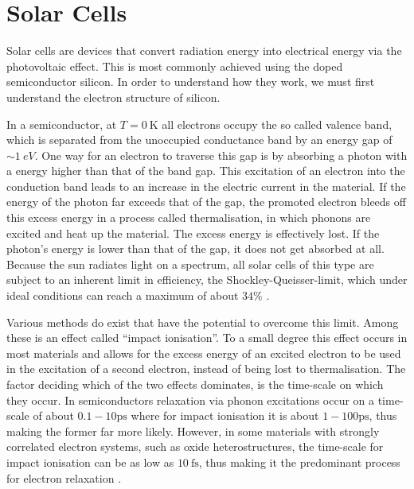 \section{Solar Cells}

Solar cells are devices that convert radiation energy into electrical energy via the photovoltaic effect. This is most commonly achieved using the doped semiconductor silicon. In order to understand how they work, we must first understand the electron structure of silicon.
\medskip

In a semiconductor, at $T=\SI{0}{\kelvin}$ all electrons occupy the so called valence band, which is separated from the unoccupied conductance band by an energy gap of $\sim \SI{1}{eV}$. One way for an electron to traverse this gap is by absorbing a photon with a energy higher than that of the band gap. This excitation of an electron into the conduction band leads to an increase in the electric current in the material. If the energy of the photon far exceeds that of the gap, the promoted electron bleeds off this excess energy in a process called thermalisation, in which phonons are excited and heat up the material. The excess energy is effectively lost. If the photon's energy is lower than that of the gap, it does not get absorbed at all. Because the sun radiates light on a spectrum, all solar cells  of this type are subject to an inherent limit in efficiency, the Shockley-Queisser-limit, which under ideal conditions can reach a maximum of about $34\%$ \cite{shockley_queisser}.

\medskip

Various methods do exist that have the potential to overcome this limit. Among these is an effect called ``impact ionisation''. To a small degree this effect occurs in most materials and allows for the excess energy of an excited electron to be used in the excitation of a second electron, instead of being lost to thermalisation. The factor deciding which of the two effects dominates, is the time-scale on which they occur. In semiconductors relaxation via phonon excitations occur on a time-scale of about $0.1 - 10 \si{\pico\second}$ where for impact ionisation it is about $1-100\si{\pico\second}$, thus making the former far more likely. However, in some materials with strongly correlated electron systems, such as oxide heterostructures, the time-scale for impact ionisation can be as low as $\SI{10}{\femto\second}$, thus making it the predominant process for electron relaxation \cite{time_scales}.




